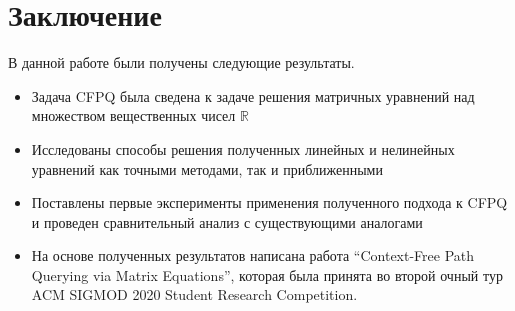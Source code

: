 \documentclass[12pt]{matmex-diploma-custom}
\begin{document}
    








\section{Заключение}
В данной работе были получены следующие результаты.

\begin{itemize}
	  \item Задача CFPQ была сведена к задаче решения матричных уравнений над множеством вещественных чисел $\mathbb{R}$
      \item Исследованы способы решения полученных линейных и нелинейных уравнений как точными методами, так и приближенными
      \item Поставлены первые эксперименты применения полученного подхода к CFPQ и проведен сравнительный анализ с существующими аналогами
      \item На основе полученных результатов написана работа \linebreak “Context-Free Path Querying via Matrix Equations”, которая была принята во второй очный тур ACM SIGMOD 2020 Student Research Competition.
\end{itemize}
\end{document}
